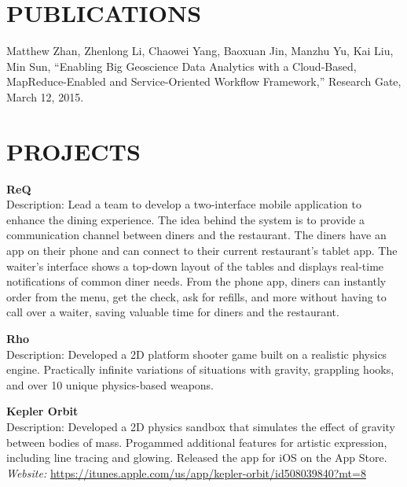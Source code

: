 \documentclass[line,margin]{res}
\begin{document}
\begin{resume}
                 \section{PUBLICATIONS}
                 Matthew Zhan, Zhenlong Li, Chaowei Yang, Baoxuan Jin, Manzhu Yu, Kai Liu, Min Sun, ``Enabling Big Geoscience Data Analytics with a Cloud-Based, MapReduce-Enabled and Service-Oriented Workflow Framework,'' Research Gate, March 12, 2015.

                 \section{PROJECTS}
                         \textbf {ReQ} \\                 
                         Description: Lead a team to develop a two-interface mobile application to enhance the dining experience. The idea behind the system is to provide a communication channel between diners and the restaurant. The diners have an app on their phone and can connect to their current restaurant's tablet app. The waiter's interface shows a top-down layout of the tables and displays real-time notifications of common diner needs. From the phone app, diners can instantly order from the menu, get the check, ask for refills, and more without having to call over a waiter, saving valuable time for diners and the restaurant.

                         \textbf{Rho} \\
                         Description: Developed a 2D platform shooter game built on a realistic physics engine. Practically infinite variations of situations with gravity, grappling hooks, and over 10 unique physics-based weapons.

                         \textbf{Kepler Orbit} \\
                         Description: Developed a 2D physics sandbox that simulates the effect of gravity between bodies of mass. Progammed additional features for artistic expression, including line tracing and glowing. Released the app for iOS on the App Store. \\
                         \textit{Website: } \url{https://itunes.apple.com/us/app/kepler-orbit/id508039840?mt=8}
                         

\end{resume}
\end{document}
